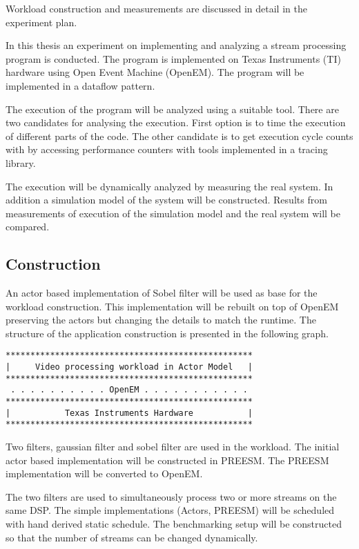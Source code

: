 Workload construction and measurements are discussed in detail in the experiment plan.

In this thesis an experiment on implementing and analyzing a stream processing program is conducted. The program is implemented on Texas Instruments (TI) hardware using Open Event Machine (OpenEM). The program will be implemented in a dataflow pattern.

The execution of the program will be analyzed using a suitable tool. There are two candidates for analysing the execution. First option is to time the execution of different parts of the code. The other candidate is to get execution cycle counts with by accessing performance counters with tools implemented in a tracing library.

The execution will be dynamically analyzed by measuring the real system. In addition a simulation model of the system will be constructed. Results from measurements of execution of the simulation model and the real system will be compared.
\subsection{Construction}
An actor based implementation of Sobel filter will be used as base for the workload construction. This implementation will be rebuilt on top of OpenEM preserving the actors but changing the details to match the runtime. The structure of the application construction is presented in the following graph.

\begin{samepage}
\begin{verbatim}
**************************************************
|     Video processing workload in Actor Model   |
**************************************************
 . . . . . . . . . . OpenEM . . . . . . . . . . .
**************************************************
|           Texas Instruments Hardware           |
**************************************************
\end{verbatim}
\end{samepage}

Two filters, gaussian filter and sobel filter are used in the workload. The initial actor based implementation will be constructed in PREESM. The PREESM implementation will be converted to OpenEM.

The two filters are used to simultaneously process two or more streams on the same DSP. The simple implementations (Actors, PREESM) will be scheduled with hand derived static schedule. The benchmarking setup will be constructed so that the number of streams can be changed dynamically.

